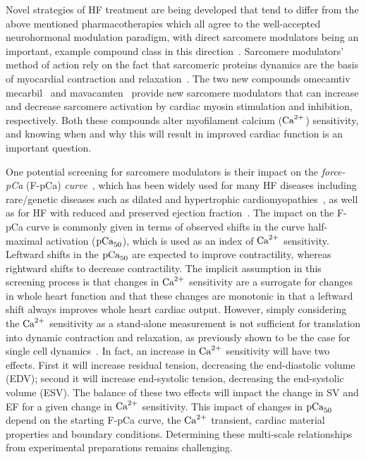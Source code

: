 \vspace{0.2cm}
Novel strategies of HF treatment are being developed that tend to differ from the above mentioned pharmacotherapies which all agree to the well-accepted neurohormonal modulation paradigm, with direct sarcomere modulators being an important, example compound class in this direction~\cite{Tsukamoto:2020}. Sarcomere modulators' method of action rely on the fact that sarcomeric proteins dynamics are the basis of myocardial contraction and relaxation~\cite{Solaro:1998}. The two new compounds omecamtiv mecarbil~\cite{Teerlink:2016} and mavacamten~\cite{Olivotto:2020} provide new sarcomere modulators that can increase and decrease sarcomere activation by cardiac myosin stimulation and inhibition, respectively. Both these compounds alter myofilament calcium ($\textrm{Ca}^{2+}$) sensitivity, and knowing when and why this will result in improved cardiac function is an important question.

\vspace{0.2cm}
One potential screening for sarcomere modulators is their impact on the \textit{force-pCa} (F-pCa) \textit{curve}~\cite{Walker:2010}, which has been widely used for many HF diseases including rare/genetic diseases such as dilated and hypertrophic cardiomyopathies~\cite{Groen:2020,Bai:2013,Michael:2016,Kirschner:2005,Harris:2002}, as well as for HF with reduced and preserved ejection fraction~\cite{Nagy:2015,Kampourakis:2018,Kieu:2019,Awinda:2021,Mamidi:2018,Sparrow:2020}. The impact on the F-pCa curve is commonly given in terms of observed shifts in the curve half-maximal activation ($\textrm{pCa}_{50}$), which is used as an index of $\textrm{Ca}^{2+}$ sensitivity. Leftward shifts in the $\textrm{pCa}_{50}$ are expected to improve contractility, whereas rightward shifts to decrease contractility. The implicit assumption in this screening process is that changes in $\textrm{Ca}^{2+}$ sensitivity are a surrogate for changes in whole heart function and that these changes are monotonic in that a leftward shift always improves whole heart cardiac output. However, simply considering the $\textrm{Ca}^{2+}$ sensitivity as a stand-alone measurement is not sufficient for translation into dynamic contraction and relaxation, as previously shown to be the case for single cell dynamics~\cite{Chung:2016}. In fact, an increase in $\textrm{Ca}^{2+}$ sensitivity will have two effects. First it will increase residual tension, decreasing the end-diastolic volume (EDV); second it will increase end-systolic tension, decreasing the end-systolic volume (ESV). The balance of these two effects will impact the change in SV and EF for a given change in $\textrm{Ca}^{2+}$ sensitivity. This impact of changes in $\textrm{pCa}_{50}$ depend on the starting F-pCa curve, the $\textrm{Ca}^{2+}$ transient, cardiac material properties and boundary conditions. Determining these multi-scale relationships from experimental preparations remains challenging.


